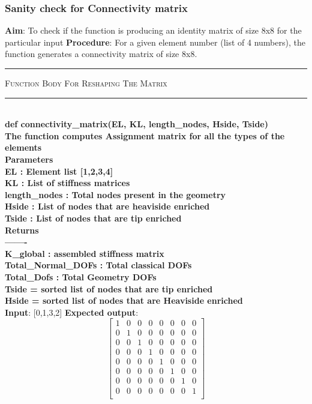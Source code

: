 \documentclass[fleqn, 12.5pt,a4paper]{report}
\begin{document}
\vspace{-0.5cm}
\subsubsection{Sanity check for Connectivity matrix}
\textbf{Aim}: To check if the function is producing an identity matrix of size 8x8 for the particular input\newline
\textbf{Procedure}: For a given element number (list of 4 numbers), the function generates a connectivity matrix of size 8x8.
\\
{ \rule{\linewidth}{0.05cm}}
	{\scshape Function Body For Reshaping The Matrix}\\
{ \rule{\linewidth}{0.05cm}}
{\selectfont
\\
\textbf{def connectivity{\_}matrix(EL, KL, length{\_}nodes, Hside, Tside)\\
    The function computes Assignment matrix for all the types of the elements\\
    Parameters\\
    EL : Element list [1,2,3,4]\\
    KL : List of stiffness matrices\\
    length{\_}nodes : Total nodes present in the geometry\\
    Hside : List of nodes that are heaviside enriched\\
    Tside : List of nodes that are tip enriched\\
    Returns\\
    -------\\
    K{\_}global : assembled stiffness matrix\\
    Total{\_}Normal{\_}DOFs : Total classical DOFs\\
    Total{\_}Dofs : Total Geometry DOFs\\
    Tside = sorted list of nodes that are tip enriched\\
    Hside = sorted list of nodes that are Heaviside enriched\\
    }}
\textbf{Input}: [0,1,3,2]
\newline                   
\textbf{Expected output}:
$$
 \begin{bmatrix}
1 & 0 & 0 & 0 & 0 & 0 & 0 & 0 \\
0 & 1 & 0 & 0 & 0 & 0 & 0 & 0 \\
0 & 0 & 1 & 0 & 0 & 0 & 0 & 0 \\
0 & 0 & 0 & 1 & 0 & 0 & 0 & 0 \\
0 & 0 & 0 & 0 & 1 & 0 & 0 & 0 \\
0 & 0 & 0 & 0 & 0 & 1 & 0 & 0 \\
0 & 0 & 0 & 0 & 0 & 0 & 1 & 0 \\
0 & 0 & 0 & 0 & 0 & 0 & 0 & 1 \\
\end{bmatrix}
$$
\end{document}
